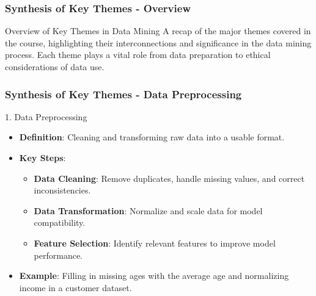 \documentclass[aspectratio=169]{beamer}
\begin{document}
\begin{frame}[fragile]
    \frametitle{Synthesis of Key Themes - Overview}
    \begin{block}{Overview of Key Themes in Data Mining}
        A recap of the major themes covered in the course, highlighting their interconnections and significance in the data mining process.
        Each theme plays a vital role from data preparation to ethical considerations of data use.
    \end{block}
\end{frame}

\begin{frame}[fragile]
    \frametitle{Synthesis of Key Themes - Data Preprocessing}
    \begin{block}{1. Data Preprocessing}
        \begin{itemize}
            \item \textbf{Definition}: Cleaning and transforming raw data into a usable format.
            \item \textbf{Key Steps}:
                \begin{itemize}
                    \item \textbf{Data Cleaning}: Remove duplicates, handle missing values, and correct inconsistencies.
                    \item \textbf{Data Transformation}: Normalize and scale data for model compatibility.
                    \item \textbf{Feature Selection}: Identify relevant features to improve model performance.
                \end{itemize}
            \item \textbf{Example}: Filling in missing ages with the average age and normalizing income in a customer dataset.
        \end{itemize}
    \end{block}
\end{frame}
\end{document}
